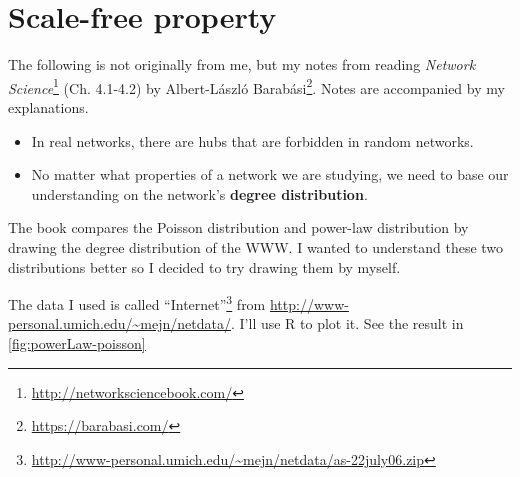 \documentclass[
]{krantz}
\makeatletter
\renewcommand{\href}[2]{#2\footnote{\url{#1}}}
\newenvironment{kframe}{%
\medskip{}
\setlength{\fboxsep}{.8em}
 \def\at@end@of@kframe{}%
 \ifinner\ifhmode%
  \def\at@end@of@kframe{\end{minipage}}%
  \begin{minipage}{\columnwidth}%
 \fi\fi%
 \def\FrameCommand##1{\hskip\@totalleftmargin \hskip-\fboxsep
 \colorbox{shadecolor}{##1}\hskip-\fboxsep
     \hskip-\linewidth \hskip-\@totalleftmargin \hskip\columnwidth}%
 \MakeFramed {\advance\hsize-\width
   \@totalleftmargin\z@ \linewidth\hsize
   \@setminipage}}%
 {\par\unskip\endMakeFramed%
 \at@end@of@kframe}
\newenvironment{rmdblock}[1]
  {
  \begin{itemize}
  \renewcommand{\labelitemi}{
    \raisebox{-.7\height}[0pt][0pt]{
      {\setkeys{Gin}{width=3em,keepaspectratio}\texttt{[image: images/\#1]}}
    }
  }
  \setlength{\fboxsep}{1em}
  \begin{kframe}
  \item
  }
  {
  \end{kframe}
  \end{itemize}
  }
\newenvironment{rmdnote}
  {\begin{rmdblock}{note}}
  {\end{rmdblock}}
\makeatother
\begin{document}
\hypertarget{scale-free-property}{%
\section{Scale-free property}\label{scale-free-property}}

\begin{rmdnote}
The following is not originally from me, but my notes from reading \href{http://networksciencebook.com/}{\emph{Network Science}} (Ch. 4.1-4.2) by \href{https://barabasi.com/}{Albert-László Barabási}. Notes are accompanied by my explanations.
\end{rmdnote}

\begin{itemize}
\item
  In real networks, there are hubs that are forbidden in random networks.
\item
  No matter what properties of a network we are studying, we need to base our understanding on the network's \textbf{degree distribution}.
\end{itemize}

The book compares the Poisson distribution and power-law distribution by drawing the degree distribution of the WWW. I wanted to understand these two distributions better so I decided to try drawing them by myself.

The data I used is called \href{http://www-personal.umich.edu/~mejn/netdata/as-22july06.zip}{``Internet''} from \url{http://www-personal.umich.edu/~mejn/netdata/}. I'll use R to plot it. See the result in \ref{fig:powerLaw-poisson}
\end{document}

